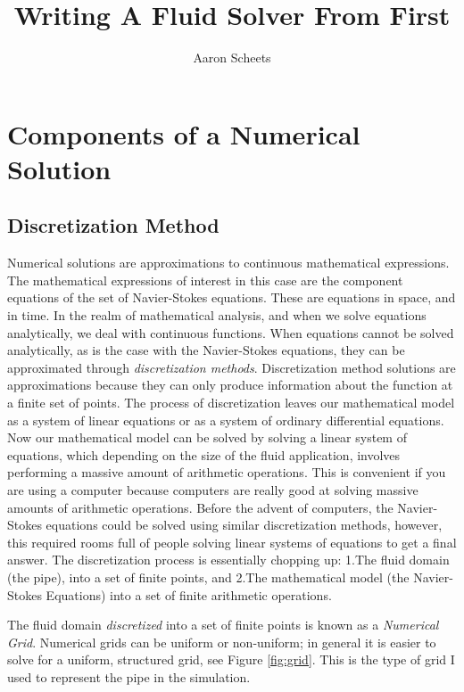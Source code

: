 \documentclass[twocolumn,12pth]{article}
\title{Writing A Fluid Solver From First}
\author{Aaron Scheets}
\begin{document}
\maketitle

\section{Components of a Numerical Solution}




\subsection{Discretization Method}

Numerical solutions are approximations to continuous mathematical expressions.
The mathematical expressions of interest in this case are the component equations of the set of Navier-Stokes equations.
These are equations in space, and in time. 
In the realm of mathematical analysis, and when we solve equations analytically, we deal with continuous functions.
When equations cannot be solved analytically, as is the case with the Navier-Stokes equations, they can be approximated through \textit{discretization methods}.
Discretization method solutions are approximations because they can only produce information about the function at a finite set of points.
The process of discretization leaves our mathematical model as a system of linear equations or as a system of ordinary differential equations.
Now our mathematical model can be solved by solving a linear system of equations, which depending on the size of the fluid application, involves performing a massive amount of arithmetic operations.
This is convenient if you are using a computer because computers are really good at solving massive amounts of arithmetic operations.
Before the advent of computers, the Navier-Stokes equations could be solved using similar discretization methods, however, this required rooms full of people solving linear systems of equations to get a final answer.
The discretization process is essentially chopping up: 1.The fluid domain (the pipe), into a set of finite points, and 2.The mathematical model (the Navier-Stokes Equations) into a set of finite arithmetic operations.

The fluid domain \textit{discretized} into a set of finite points is known as a \textit{Numerical Grid}.
Numerical grids can be uniform or non-uniform; in general it is easier to solve for a uniform, structured grid, see Figure \ref{fig:grid}.
This is the type of grid I used to represent the pipe in the simulation.
\end{document}
